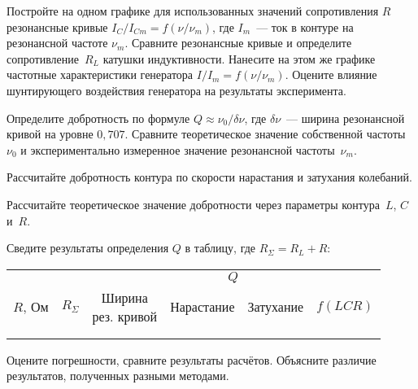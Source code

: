 \begin{lab:task}

	\item Постройте на одном графике для использованных 
    значений сопротивления $R$ резонансные кривые 
    $I_C/I_{Cm} = f(\nu/\nu_m)$,
    где $I_m$~--- ток в контуре на резонансной частоте $\nu_m$.
    Сравните резонансные кривые и определите сопротивление~$R_L$ катушки 
    индуктивности. 
    Нанесите на этом же графике частотные характеристики генератора
    $I/I_m = f(\nu/\nu_m)$.
    Оцените влияние шунтирующего воздействия генератора 
    на результаты эксперимента.
    
    \item Определите добротность по формуле $Q \approx \nu_0/\delta\nu$,
    где $\delta \nu$~--- ширина резонансной кривой на уровне $0,707$.
    Сравните теоретическое значение собственной частоты~$\nu_0$
    и экспериментально измеренное значение резонансной частоты~$\nu_m$.

	\item Рассчитайте добротность контура по скорости нарастания и 
    затухания колебаний.

	\item Рассчитайте теоретическое значение добротности через параметры
контура~$L$, $C$ и~$R$.

\item Сведите результаты определения $Q$ в таблицу, где $R_{\Sigma}=R_L+R$:\par
{\centering\small
\begin{tabular}{|c|c|c|c|c|c|}
\hline
& & \multicolumn{4}{c|}{$Q$}\\
\cline{3-6}
$R$, Ом & $R_{\Sigma}$ & 
\parbox{2cm}{Ширина\\[-4pt] рез. кривой} & Нарастание & Затухание &$f(LCR)$\\
\hline
 & & & & & \\
 & & & & &\\
\hline
\end{tabular}
}
%
	\item Оцените погрешности, сравните результаты расчётов. Объясните
    различие результатов, полученных разными методами.
\end{lab:task}


